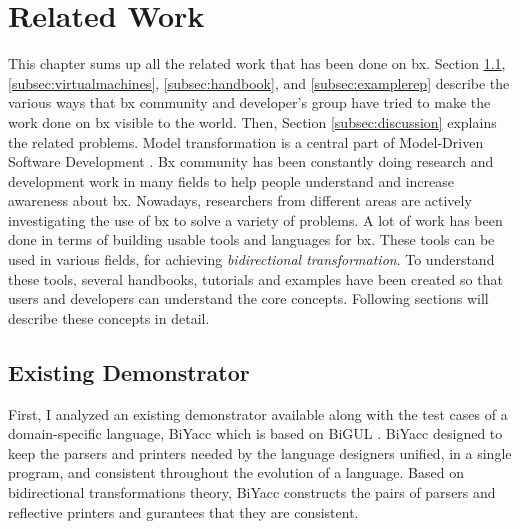 \section{Related Work}\label{sec:relatedwork}
This chapter sums up all the related work that has been done on bx. Section \ref{subsec:existingdemo}, \ref{subsec:virtualmachines}, \ref{subsec:handbook}, and \ref{subsec:examplerep} describe the various ways that bx community and developer's group have tried to make the work done on bx visible to the world. Then, Section \ref{subsec:discussion} explains the related problems. 
\newline\newline Model transformation is a central part of Model-Driven Software Development \cite{bx-grace} \cite{bx-dagstuhl}. Bx community has been constantly doing research and development work in many fields to help people understand and increase awareness about bx. Nowadays, researchers from different areas are actively investigating the use of bx to solve a variety of problems. A lot of work has been done in terms of building usable tools and languages for bx. These tools can be used in various fields, for achieving \textit{bidirectional transformation}. To understand these tools, several handbooks, tutorials and examples have been created so that users and developers can understand the core concepts. Following sections will describe these concepts in detail.

\subsection{Existing Demonstrator}\label{subsec:existingdemo}
First, I analyzed an existing demonstrator available along with the test cases of a domain-specific language, BiYacc \cite{biyacc} which is based on BiGUL \cite{bigul}. BiYacc designed to keep the parsers and printers needed by the language designers unified, in a single program, and consistent throughout the evolution of a language. Based on bidirectional transformations theory, BiYacc constructs the pairs of parsers and reflective printers and gurantees that they are consistent.

